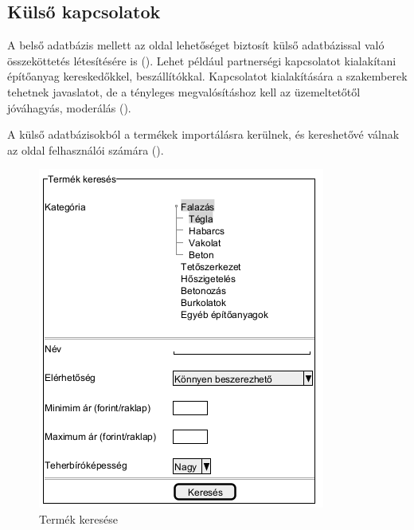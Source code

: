 \subsection{Külső kapcsolatok}
A belső adatbázis mellett az oldal lehetőséget biztosít külső adatbázissal való összeköttetés létesítésére is (). Lehet például partnerségi kapcsolatot kialakítani építőanyag kereskedőkkel, beszállítókkal. Kapcsolatot kialakítására a szakemberek tehetnek javaslatot, de a tényleges megvalósításhoz kell az üzemeltetőtől jóváhagyás, moderálás ().


A külső adatbázisokból a termékek importálásra kerülnek, és kereshetővé válnak az oldal felhasználói számára ().



\begin{figure}[h]
	\centering
	\includegraphics[scale=0.6]{img/termek_keres.png}
	\caption*{Termék keresése}
	\label{fig:term_ker}
\end{figure}

